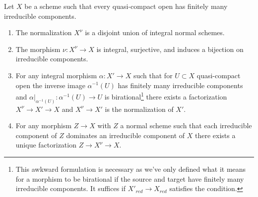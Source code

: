 \begin{lemma}
\label{lemma-normalization-normal}
Let $X$ be a scheme such that every quasi-compact open has
finitely many irreducible components.
\begin{enumerate}
\item The normalization $X^\nu$ is a disjoint union of integral normal schemes.
\item The morphism $\nu : X^\nu \to X$ is integral, surjective, and
induces a bijection on irreducible components.
\item For any integral morphism $\alpha : X' \to X$ such that for
$U \subset X$ quasi-compact open the inverse image $\alpha^{-1}(U)$ has
finitely many irreducible components and
$\alpha|_{\alpha^{-1}(U)} : \alpha^{-1}(U) \to U$ is birational\footnote{This
awkward formulation is necessary as we've only defined what
it means for a morphism to be birational if the source and target
have finitely many irreducible components. It suffices if
$X'_{red} \to X_{red}$ satisfies the condition.}
there exists a factorization
$X^\nu \to X' \to X$ and $X^\nu \to X'$ is the normalization of $X'$.
\item For any morphism $Z \to X$ with $Z$ a normal scheme
such that each irreducible component of $Z$ dominates an irreducible
component of $X$ there exists a unique factorization $Z \to X^\nu \to X$.
\end{enumerate}
\end{lemma}

